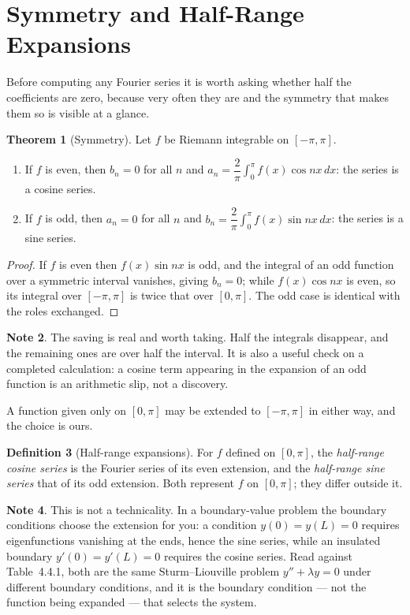\documentclass[12pt,a4paper]{report}
\theoremstyle{definition}
\newtheorem{thm}{Theorem}[section]
\newtheorem{defn}[thm]{Definition}
\newtheorem{note}[thm]{Note}
\theoremstyle{plain}
\begin{document}
\section{Symmetry and Half-Range Expansions}

Before computing any Fourier series it is worth asking whether half the
coefficients are zero, because very often they are and the symmetry that makes
them so is visible at a glance.

\begin{thm}[Symmetry]
Let $f$ be Riemann integrable on $[-\pi,\pi]$.
\begin{enumerate}
\item[(i)] If $f$ is even, then $b_n = 0$ for all $n$ and
$a_n = \dfrac{2}{\pi}\displaystyle\int^{\pi}_{0}f(x)\cos nx\,dx$: the series is
a cosine series.
\item[(ii)] If $f$ is odd, then $a_n = 0$ for all $n$ and
$b_n = \dfrac{2}{\pi}\displaystyle\int^{\pi}_{0}f(x)\sin nx\,dx$: the series is
a sine series.
\end{enumerate}
\end{thm}

\begin{proof}
If $f$ is even then $f(x)\sin nx$ is odd, and the integral of an odd function
over a symmetric interval vanishes, giving $b_n=0$; while $f(x)\cos nx$ is even,
so its integral over $[-\pi,\pi]$ is twice that over $[0,\pi]$. The odd case is
identical with the roles exchanged.
\end{proof}

\begin{note}
The saving is real and worth taking. Half the integrals disappear, and the
remaining ones are over half the interval. It is also a useful check on a
completed calculation: a cosine term appearing in the expansion of an odd
function is an arithmetic slip, not a discovery.
\end{note}

A function given only on $[0,\pi]$ may be extended to $[-\pi,\pi]$ in either
way, and the choice is ours.

\begin{defn}[Half-range expansions]
For $f$ defined on $[0,\pi]$, the \emph{half-range cosine series} is the Fourier
series of its even extension, and the \emph{half-range sine series} that of its
odd extension. Both represent $f$ on $[0,\pi]$; they differ outside it.
\end{defn}

\begin{note}
This is not a technicality. In a boundary-value problem the boundary conditions
choose the extension for you: a condition $y(0)=y(L)=0$ requires eigenfunctions
vanishing at the ends, hence the sine series, while an insulated boundary
$y'(0)=y'(L)=0$ requires the cosine series. Read against
Table~4.4.1, both are the same Sturm--Liouville problem $y''+\lambda y=0$ under
different boundary conditions, and it is the boundary condition --- not the
function being expanded --- that selects the system.
\end{note}
\end{document}
